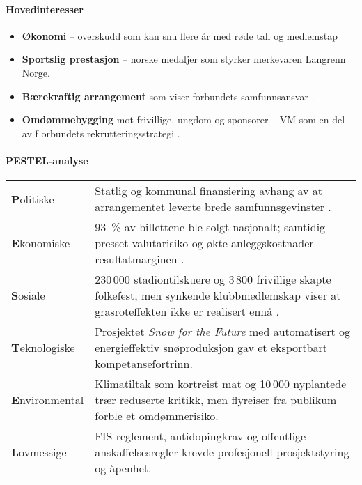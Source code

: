 \paragraph{Hovedinteresser}

\begin{itemize}
    \item \textbf{Økonomi} -- overskudd som kan snu flere år med røde tall og 
    medlemstap\cite{Adresseavisen}

    \item \textbf{Sportslig prestasjon} -- norske medaljer som styrker merkevaren Langrenn Norge.
    
    \item \textbf{Bærekraftig arrangement} som viser forbundets samfunnsansvar \cite{TrondheimKommuneVM}.

    \item \textbf{Omdømmebygging} mot frivillige, ungdom og sponsorer -- VM som en del av f
    orbundets rekrutteringsstrategi \cite{OsloVM}.
\end{itemize}

\paragraph{PESTEL-analyse}

\begin{table}[ht]
    \centering
    \begin{tabular}{@{}p{2.7cm}p{10.2cm}@{}}
        \toprule                                                                                                                                            \\ \midrule
        \textbf{P}olitiske     & Statlig og kommunal finansiering avhang av at arrangementet leverte brede samfunnsgevinster \cite{TrondheimKommuneVM}.                                                       \\
        \textbf{E}konomiske    & 93~\% av billettene ble solgt nasjonalt; samtidig presset valutarisiko og økte anleggskostnader resultatmarginen \cite{AdressaKjopefest}.                                  \\
        \textbf{S}osiale       & 230\,000 stadiontilskuere og 3\,800 frivillige skapte folkefest, men synkende klubbmedlemskap viser at grasroteffekten ikke er realisert ennå \cite{Adresseavisen,OsloVM}. \\
        \textbf{T}eknologiske  & Prosjektet \textit{Snow for the Future} med automatisert og energieffektiv snøproduksjon gav et eksportbart kompetansefortrinn\cite{Trondheim2025Sustainability}.          \\
        \textbf{E}nvironmental & Klimatiltak som kortreist mat og 10\,000 nyplantede trær reduserte kritikk, men flyreiser fra publikum forble et omdømmerisiko.                                            \\
        \textbf{L}ovmessige    & FIS-reglement, antidopingkrav og offentlige anskaffelsesregler krevde profesjonell prosjektstyring og åpenhet.                                                             \\ \bottomrule
    \end{tabular}
\end{table}

